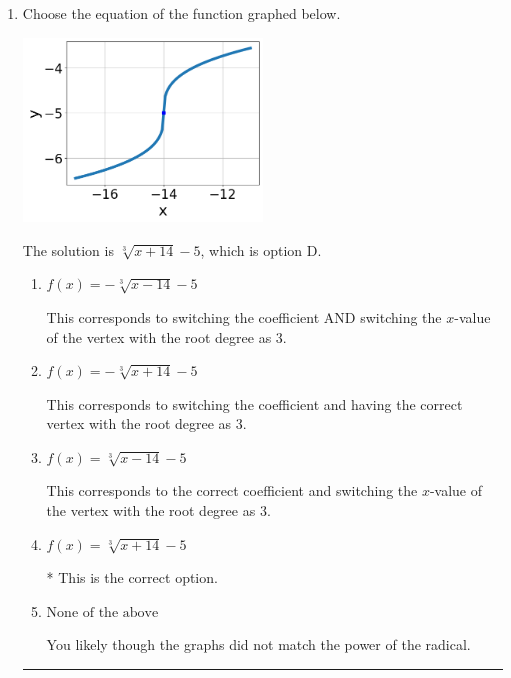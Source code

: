 \documentclass{extbook}[14pt]
\newcommand{\litem}[1]{\item #1

\rule{\textwidth}{0.4pt}}
\begin{document}
\begin{enumerate}\litem{
Choose the equation of the function graphed below.

\begin{center}
    \includegraphics[width=0.5\textwidth]{../Figures/radicalGraphToEquationC.png}
\end{center}


The solution is \( \sqrt[3]{x + 14} - 5 \), which is option D.\begin{enumerate}[label=\Alph*.]
\item \( f(x) = - \sqrt[3]{x - 14} - 5 \)

This corresponds to switching the coefficient AND switching the $x$-value of the vertex with the root degree as $3$.
\item \( f(x) = - \sqrt[3]{x + 14} - 5 \)

This corresponds to switching the coefficient and having the correct vertex with the root degree as $3$.
\item \( f(x) = \sqrt[3]{x - 14} - 5 \)

This corresponds to the correct coefficient and switching the $x$-value of the vertex with the root degree as $3$.
\item \( f(x) = \sqrt[3]{x + 14} - 5 \)

* This is the correct option.
\item \( \text{None of the above} \)

You likely though the graphs did not match the power of the radical.
\end{enumerate}

}
\end{enumerate}
\end{document}
